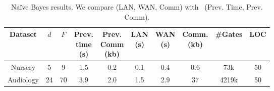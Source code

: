 

\setlength\tabcolsep{2.5pt}
\begin{table}
\begin{tabular}{|c|c|c|c|c|c |c|c|c|c|}
\hline
Dataset & $d$ & $F$ & \thead{Prev. \\ time\\ (s)} & \thead{Prev. \\ Comm\\ (kb)} & \thead{LAN  \\ (s)} & \thead{WAN\\ (s)} & \thead{Comm. \\(kb)} & \#Gates  & LOC\\
\hline
Nursery & 5 & 9 & 1.5 & 0.2 & 0.1 & 0.4 & 0.6  & 73k & 50\\
\hline
Audiology & 24 & 70 & 3.9 & 2.0 & 1.5 & 2.9 & 37  & 4219k & 50\\
\hline
\end{tabular}
\caption{Na\"{i}ve Bayes results. We compare \tool (LAN, WAN, Comm)
 with~\cite{shafindss} (Prev. Time, Prev. Comm).}
 \label{tab:nb} 
\end{table}









